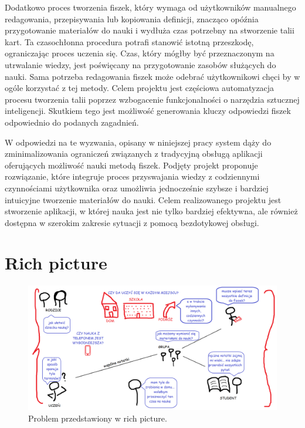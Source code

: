 Dodatkowo proces tworzenia fiszek, który wymaga od użytkowników manualnego redagowania, przepisywania lub kopiowania definicji, znacząco opóźnia przygotowanie materiałów do nauki i wydłuża czas potrzebny na stworzenie talii kart. Ta czasochłonna procedura potrafi stanowić istotną przeszkodę, ograniczając proces uczenia się. Czas, który mógłby być przeznaczonym na utrwalanie wiedzy, jest poświęcany na przygotowanie zasobów służących do nauki. Sama potrzeba redagowania fiszek może odebrać użytkownikowi chęci by w ogóle korzystać z tej metody. Celem projektu jest częściowa automatyzacja procesu tworzenia talii poprzez wzbogacenie funkcjonalności o narzędzia sztucznej inteligencji. Skutkiem tego jest możliwość generowania kluczy odpowiedzi fiszek odpowiednio do podanych zagadnień.

W odpowiedzi na te wyzwania, opisany w niniejszej pracy system dąży do zminimalizowania ograniczeń związanych z tradycyjną obsługą aplikacji oferujących możliwość nauki metodą fiszek. Podjęty projekt proponuje rozwiązanie, które integruje proces przyswajania wiedzy z codziennymi czynnościami użytkownika oraz umożliwia jednocześnie szybsze i bardziej intuicyjne tworzenie materiałów do nauki. Celem realizowanego projektu jest stworzenie aplikacji, w której nauka jest nie tylko bardziej efektywna, ale również dostępna w szerokim zakresie sytuacji z pomocą bezdotykowej obsługi.

\section{Rich picture}

\begin{figure}[H]
    \centering
    \includegraphics[width=1\textwidth]{chapters/chapter_2/rich_picture.png}
    \caption{Problem przedstawiony w rich picture.}
    \label{img:rich_picture}
\end{figure}


